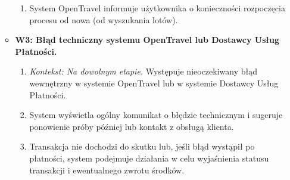 \documentclass[a4paper,12pt]{article}
\begin{document}
\begin{itemize}
\begin{itemize}
\begin{enumerate}
                    \item System OpenTravel informuje użytkownika o konieczności rozpoczęcia procesu od nowa (od wyszukania lotów).
                \end{enumerate}
            \item \textbf{W3: Błąd techniczny systemu OpenTravel lub Dostawcy Usług Płatności.}
                \begin{enumerate}
                    \item \textit{Kontekst: Na dowolnym etapie.} Występuje nieoczekiwany błąd wewnętrzny w systemie OpenTravel lub w systemie Dostawcy Usług Płatności.
                    \item System wyświetla ogólny komunikat o błędzie technicznym i sugeruje ponowienie próby później lub kontakt z obsługą klienta.
                    \item Transakcja nie dochodzi do skutku lub, jeśli błąd wystąpił po płatności, system podejmuje działania w celu wyjaśnienia statusu transakcji i ewentualnego zwrotu środków.
                \end{enumerate}
        \end{itemize}
\end{itemize}
\end{document}

